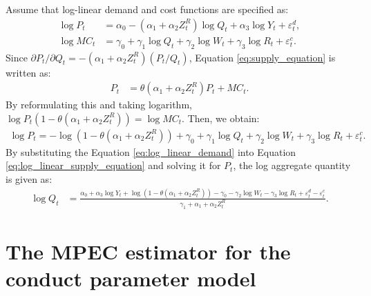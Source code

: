 \documentclass[11pt, a4paper]{article}
\begin{document}
Assume that log-linear demand and cost functions are specified as:
\begin{align}
    \log P_{t} &= \alpha_0 - (\alpha_1 + \alpha_2 Z^{R}_{t}) \log Q_t + \alpha_3 \log Y_t + \varepsilon^{d}_{t},\label{eq:log_linear_demand}\\
    \log MC_t &= \gamma_0 + \gamma_1 \log Q_t +  \gamma_2 \log W_{t} + \gamma_3 \log R_t + \varepsilon^{c}_{t}.\label{eq:log_linear_marginal_cost}
\end{align}
Since $\partial P_t/\partial Q_t = - (\alpha_1 + \alpha_2 Z_{t}^R) (P_t/Q_t) $, Equation \eqref{eq:supply_equation} is written as:
\begin{align}
    P_t &= \theta (\alpha_1 + \alpha_2 Z^{R}_{t}) P_t + MC_t.
\end{align}
By reformulating this and taking logarithm, $\log P_t(1 -\theta (\alpha_1 + \alpha_2 Z^{R}_{t})) = \log MC_t.$
Then, we obtain:
\begin{align}
    \log P_t = - \log(1 - \theta(\alpha_1 + \alpha_2 Z^{R}_{t})) + \gamma_0 + \gamma_1 \log Q_t +  \gamma_2 \log W_{t} + \gamma_3 \log R_t + \varepsilon^{c}_{t}. \label{eq:log_linear_supply_equation}
\end{align}
By substituting the Equation \eqref{eq:log_linear_demand} into Equation \eqref{eq:log_linear_supply_equation} and solving it for $P_{t}$, the log aggregate quantity is given as: 
\begin{align}
    \log Q_t &= \frac{ \alpha_0 + \alpha_3 \log Y_t + \log (1 - \theta (\alpha_1 + \alpha_2 Z^{R}_{t})) - \gamma_0  -  \gamma_2 \log W_{t} - \gamma_3 \log R_t + \varepsilon^{d}_{t} - \varepsilon^{c}_{t}}{\gamma_1+ \alpha_1 + \alpha_2 Z^{R}_{t} }.\label{eq:quantity_loglinear}
\end{align}


\section{The MPEC estimator for the conduct parameter model}
\end{document}
